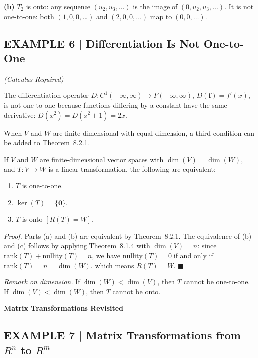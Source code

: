 \documentclass{article}
\newcommand{\redheading}[1]{{\vspace{2mm}\noindent\Large\bfseries\color{red!55!black} #1\par}\vspace{2mm}}
\begin{document}
\textbf{(b)} $T_2$ is onto: any sequence $(u_2,u_3,\ldots)$ is the image of $(0,u_2,u_3,\ldots)$.
It is not one-to-one: both $(1,0,0,\ldots)$ and $(2,0,0,\ldots)$ map to $(0,0,\ldots)$.

\subsection*{EXAMPLE 6 | Differentiation Is Not One-to-One}
\textit{(Calculus Required)}

The differentiation operator $D : C^1(-\infty,\infty) \to F(-\infty,\infty)$, $D(\mathbf{f}) = f'(x)$,
is not one-to-one because functions differing by a constant have the same derivative:
$D(x^2) = D(x^2+1) = 2x$.

When $V$ and $W$ are finite-dimensional with equal dimension, a third condition can be added
to Theorem~8.2.1.

\begin{tcolorbox}[colback=red!4, colframe=red!60!black,
  title={\textbf{Theorem 8.2.2}}, boxrule=0.5mm, arc=3mm]
If $V$ and $W$ are finite-dimensional vector spaces with $\dim(V)=\dim(W)$, and
$T : V \to W$ is a linear transformation, the following are equivalent:
\begin{enumerate}
  \item[(a)] $T$ is one-to-one.
  \item[(b)] $\ker(T) = \{\mathbf{0}\}$.
  \item[(c)] $T$ is onto $[R(T) = W]$.
\end{enumerate}
\end{tcolorbox}

\textit{Proof.} Parts (a) and (b) are equivalent by Theorem~8.2.1. The equivalence of
(b) and (c) follows by applying Theorem~8.1.4 with $\dim(V)=n$: since
$\text{rank}(T)+\text{nullity}(T) = n$, we have $\text{nullity}(T)=0$ if and only if
$\text{rank}(T)=n = \dim(W)$, which means $R(T) = W$. $\blacksquare$

\textit{Remark on dimension.} If $\dim(W) < \dim(V)$, then $T$ cannot be one-to-one.
If $\dim(V) < \dim(W)$, then $T$ cannot be onto.

\vspace{2mm}

\redheading{Matrix Transformations Revisited}

\subsection*{EXAMPLE 7 | Matrix Transformations from $R^n$ to $R^m$}
\end{document}
